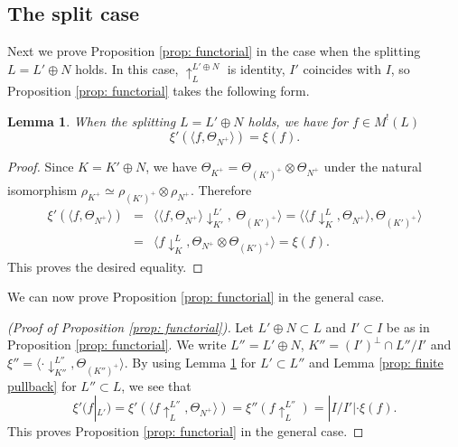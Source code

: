 \documentclass[12pt]{amsart}
\numberwithin{equation}{section}
\newtheorem{lemma}[theorem]{Lemma}
\theoremstyle{definition}
\theoremstyle{remark}
\newcommand{\pushLK}{\downarrow^{L}_{K}}
\newcommand{\ThetaK}{\Theta_{K^{+}}}
\newcommand{\ML}{M^{!}(L)}
\begin{document}
\subsection{The split case}\label{ssec: general case} 

Next we prove Proposition \ref{prop: functorial} 
in the case when the splitting $L=L'\oplus N$ holds. 
In this case, 
$\uparrow^{L'\oplus N}_{L}$ is identity, 
$I'$ coincides with $I$, 
so Proposition \ref{prop: functorial} takes the following form. 

\begin{lemma}\label{prop: split case}
When the splitting $L=L'\oplus N$ holds, we have for $f \in {\ML}$ 
\begin{equation*}
\xi'(\langle f, \Theta_{N^{+}} \rangle) = \xi(f).  
\end{equation*}
\end{lemma}

\begin{proof}
Since $K=K'\oplus N$, we have 
${\ThetaK}=\Theta_{(K')^{+}} \otimes \Theta_{N^+}$ 
under the natural isomorphism 
$\rho_{K^+}\simeq \rho_{(K')^{+}}\otimes \rho_{N^+}$. 
Therefore 
\begin{eqnarray*}
\xi'(\langle f, \Theta_{N^{+}} \rangle) 
& = & 
\langle \langle f, \Theta_{N^{+}} \rangle \! \downarrow^{L'}_{K'}, \: \Theta_{(K')^{+}} \rangle 
= 
\langle \langle f{\pushLK}, \Theta_{N^{+}} \rangle, \Theta_{(K')^{+}} \rangle \\ 
& = & 
\langle f{\pushLK}, \Theta_{N^{+}}\otimes \Theta_{(K')^{+}} \rangle 
= \xi(f). 
\end{eqnarray*}
This proves the desired equality.  
\end{proof}



We can now prove Proposition \ref{prop: functorial} in the general case. 

\begin{proof}[(Proof of Proposition \ref{prop: functorial})]
Let $L'\oplus N\subset L$ and $I'\subset I$ be as in Proposition \ref{prop: functorial}. 
We write 
$L''=L'\oplus N$,  
$K''=(I')^{\perp}\cap L''/I'$ and 
$\xi''= \langle \cdot\!\downarrow^{L''}_{K''}, \Theta_{(K'')^{+}} \rangle$. 
By using Lemma \ref{prop: split case} for $L'\subset L''$ and 
Lemma \ref{prop: finite pullback} for $L''\subset L$, 
we see that  
\begin{equation*}
\xi'(f|_{L'}) 
= \xi'(\langle f\!\uparrow_{L}^{L''}, \Theta_{N^{+}} \rangle ) 
= \xi''(f\!\uparrow_{L}^{L''}) 
= |I/I'|\cdot \xi(f). 
\end{equation*}
This proves Proposition \ref{prop: functorial} in the general case. 
\end{proof}
\end{document}
